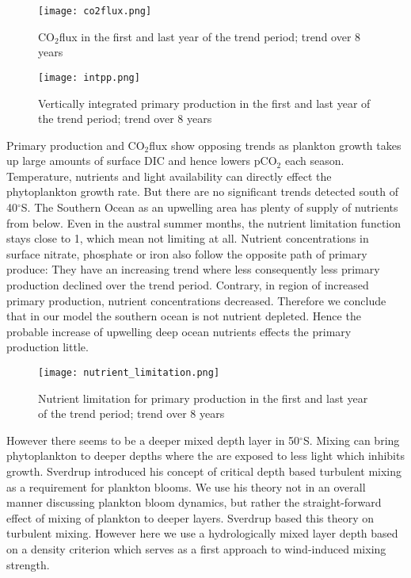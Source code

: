 \documentclass[12pt]{article}
\begin{document}
\begin{figure}
\texttt{[image: co2flux.png]} %
\label{fig:co2flux}
\caption{CO$_2$flux in the first and last year of the trend period; trend over 8 years}
\end{figure}


\begin{figure}
\texttt{[image: intpp.png]} %
\label{fig:intpp}
\caption{Vertically integrated primary production in the first and last year of the trend period; trend over 8 years}
\end{figure}

Primary production and CO$_2$flux show opposing trends as plankton growth takes up large amounts of surface DIC and hence lowers pCO$_2$ each season. 
Temperature, nutrients and light availability can directly effect the phytoplankton growth rate. But there are no significant trends detected south of 40$^\circ$S. The Southern Ocean as an upwelling area has plenty of supply of nutrients from below. Even in the austral summer months, the nutrient limitation function stays close to 1, which mean not limiting at all. Nutrient concentrations in surface nitrate, phosphate or iron also follow the opposite path of primary produce: They have an increasing trend where less consequently less primary production declined over the trend period. Contrary, in region of increased primary production, nutrient concentrations decreased. Therefore we conclude that in our model the southern ocean is not nutrient depleted. Hence the probable increase of upwelling deep ocean nutrients effects the primary production little.

\begin{figure}
\texttt{[image: nutrient\_limitation.png]} %
\label{fig:nutrient_limitation}
\caption{Nutrient limitation for primary production in the first and last year of the trend period; trend over 8 years}
\end{figure}


However there seems to be a deeper mixed depth layer in 50$^\circ$S. Mixing can bring phytoplankton to deeper depths where the are exposed to less light which inhibits growth. Sverdrup \cite{Sverdrup1953} introduced his concept of critical depth based turbulent mixing \cite{Franks2014} as a requirement for plankton blooms. We use his theory not in an overall manner discussing plankton bloom dynamics, but rather the straight-forward effect of mixing of plankton to deeper layers. 
Sverdrup based this theory on turbulent mixing. However here we use a hydrologically mixed layer depth based on a density criterion which serves as a first approach to wind-induced mixing strength. 
\end{document}
